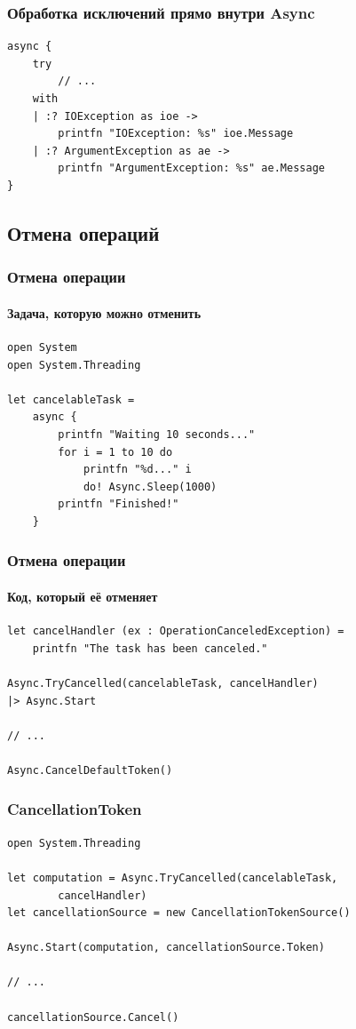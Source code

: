 \documentclass[xetex,mathserif,serif]{beamer}
\begin{document}
	\begin{frame}[fragile]
		\frametitle{Обработка исключений прямо внутри Async}
		\begin{verbatim}
async {
    try
        // ...
    with
    | :? IOException as ioe ->
        printfn "IOException: %s" ioe.Message
    | :? ArgumentException as ae ->
        printfn "ArgumentException: %s" ae.Message
}
		\end{verbatim}
	\end{frame}

	\subsection{Отмена операций}

	\begin{frame}[fragile]
		\frametitle{Отмена операции}
		\framesubtitle{Задача, которую можно отменить}
		\begin{verbatim}
open System
open System.Threading

let cancelableTask =
    async {
        printfn "Waiting 10 seconds..."
        for i = 1 to 10 do
            printfn "%d..." i
            do! Async.Sleep(1000)
        printfn "Finished!"
    }
		\end{verbatim}
	\end{frame}

	\begin{frame}[fragile]
		\frametitle{Отмена операции}
		\framesubtitle{Код, который её отменяет}
		\begin{verbatim}
let cancelHandler (ex : OperationCanceledException) =
    printfn "The task has been canceled."

Async.TryCancelled(cancelableTask, cancelHandler)
|> Async.Start

// ...

Async.CancelDefaultToken()
		\end{verbatim}
	\end{frame}

	\begin{frame}[fragile]
		\frametitle{CancellationToken}
		\begin{verbatim}
open System.Threading

let computation = Async.TryCancelled(cancelableTask, 
        cancelHandler)
let cancellationSource = new CancellationTokenSource()

Async.Start(computation, cancellationSource.Token)

// ...

cancellationSource.Cancel()
		\end{verbatim}
	\end{frame}
\end{document}
